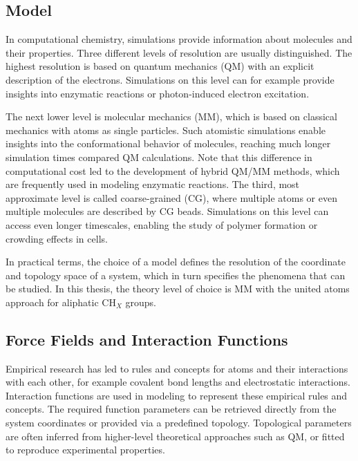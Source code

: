 \subsection{Model}
In computational chemistry, simulations provide information about molecules and their properties. Three different levels of resolution are usually distinguished.\cite{Barros2022}
The highest resolution is based on quantum mechanics (QM) with an explicit description of the electrons.\cite{Senn2009} Simulations on this level can for example provide insights into enzymatic reactions \cite{Sheng2020, Kazemi2015, Ryde2003,Naray2003} or photon-induced electron excitation\cite{Rivera2019, Li2008, Askerka2017}.  

The next lower level is molecular mechanics (MM), which is based on classical mechanics with atoms as single particles. Such atomistic simulations enable insights into the conformational behavior of molecules, \cite{Witek2016, Wang2021, Schenkmayerova2021, Mccammon1977} reaching much longer simulation times compared QM calculations. Note that this difference in computational cost led to the development of hybrid QM/MM methods, which are frequently used in modeling enzymatic reactions.\cite{Senn2009}
The third, most approximate level is called coarse-grained (CG), where multiple atoms or even multiple molecules are described by CG beads.\cite{Tozzini2005} Simulations on this level can access even longer timescales, enabling the study of polymer formation \cite{Hyeon2011, Shen2009} or crowding effects in cells\cite{Hong2020, Friedel2003}. 

In practical terms, the choice of a model defines the resolution of the coordinate and topology space of a system, which in turn specifies the phenomena that can be studied. In this thesis, the theory level of choice is MM with the united atoms approach\cite{Daura1998} for aliphatic CH$_X$ groups. 

\subsection{Force Fields and Interaction Functions}
Empirical research has led to rules and concepts for atoms and their interactions with each other, for example covalent bond lengths and electrostatic interactions.\cite{Morse1929, Pauling1934, Gillmor2017} 
Interaction functions are used in modeling to represent these empirical rules and concepts. The required function parameters can be retrieved directly from the system coordinates or provided via a predefined topology.  \cite{Mackerell2004, Cornell1995, Oostenbrink2004} 
Topological parameters are often inferred from higher-level theoretical approaches such as QM, or fitted to reproduce experimental properties. \cite{Oostenbrink2004}

